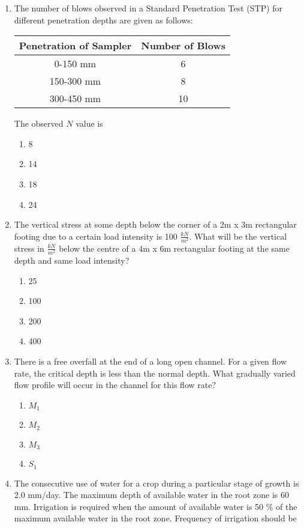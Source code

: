 \documentclass[journal]{IEEEtran}
\begin{document}
\begin{enumerate}
\begin{enumerate}
		\end{enumerate}
	\item
	The number of blows observed in a Standard Penetration Test (STP) for different penetration depths are given as follows: \\
	\begin{tabular}{|c|c|}
	\hline
	Penetration of Sampler & Number of Blows \\
	\hline
	0-150 mm & 6 \\
	150-300 mm & 8 \\
	300-450 mm & 10 \\
	\hline
	\end{tabular}
	The observed $N$ value is
		\begin{enumerate}
			\item 8
			\item 14
			\item 18
			\item 24
		\end{enumerate}
	\item
	The vertical stress at some depth below the corner of a 2m x 3m rectangular footing due to a certain load intensity is 100 $\frac{kN}{m^2}$. What will be the vertical stress in $\frac{kN}{m^2}$ below the centre of a 4m x 6m rectangular footing at the same depth and same load intensity?
		\begin{enumerate}
			\item 25
			\item 100
			\item 200
			\item 400
		\end{enumerate}
	\item
	There is a free overfall at the end of a long open channel. For a given flow rate, the critical depth is less than the normal depth. What gradually varied flow profile will occur in the channel for this flow rate?
		\begin{enumerate}
			\item $M_1$
			\item $M_2$
			\item $M_3$
			\item $S_1$
		\end{enumerate}
	\item
	The consecutive use of water for a crop during a particular stage of growth is 2.0 mm/day. The maximum depth of available water in the root zone is 60 mm. Irrigation is required when the amount of available water is 50 \% of the maximum available water in the root zone. Frequency of irrigation should be

\end{enumerate}
\end{document}
